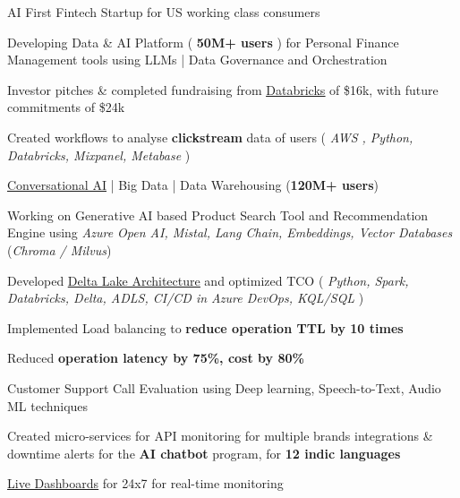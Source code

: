 \documentclass[]{deedy-resume-reversed}
\begin{document}
\vspace{\topsep} %

\begin{tightemize}
\item AI First Fintech Startup for US working class consumers
\item Developing Data \& AI Platform ( \textbf{50M+ users} ) for Personal Finance Management tools using LLMs | Data Governance and Orchestration
\item Investor pitches \& completed fundraising from \underline{\href{https://www.databricks.com/product/startups}{Databricks}} of \$16k, with future commitments of \$24k
\item Created workflows to analyse \textbf{clickstream} data of users (\textit{ AWS , Python,  Databricks, Mixpanel, Metabase })
\end{tightemize}
\sectionsep

\vspace{\topsep} %

\begin{tightemize}
\item \href{https://drive.google.com/file/d/1pztxC-TmhhKaqk0sQUJ8XaVXDKmad92V/view?usp=sharing}{\underline{Conversational AI}} | Big Data | Data Warehousing (\textbf{120M+ users})
\item Working on Generative AI based Product Search Tool and Recommendation Engine using \textit{Azure Open AI, Mistal, Lang Chain, Embeddings, Vector Databases} (\textit{Chroma / Milvus})
\item Developed \href{https://drive.google.com/file/d/1FH0p2Gy_5d0h4D7Czsslx3dkdUqMD-IP/view?usp=sharing}{\underline{Delta Lake Architecture}} and optimized TCO (\textit{ Python, Spark, Databricks, Delta, ADLS, CI/CD in Azure DevOps, KQL/SQL })
\item Implemented Load balancing to\textbf{ reduce operation TTL by 10 times}
\item Reduced \textbf{operation latency by 75\%, cost by 80\%}
\item Customer Support Call Evaluation using Deep learning, Speech-to-Text, Audio ML techniques
\item Created micro-services for API monitoring for multiple brands integrations \& downtime alerts for the \textbf{AI chatbot} program, for \textbf{12 indic languages}
\item \href{https://drive.google.com/file/d/1ON88613DfbFg78HwDsAdzry1J6u3jsra/view?usp=drive_link}{\underline{Live Dashboards}} for 24x7 for real-time monitoring
\end{tightemize}
\sectionsep
\end{document}
